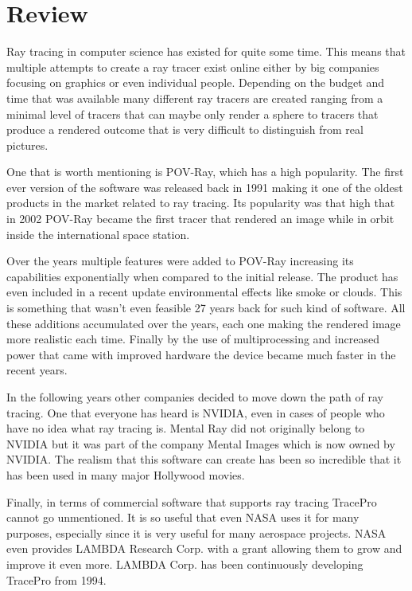 \documentclass[10pt]{scrartcl}
\begin{document}
\section{Review}
Ray tracing in computer science has existed for quite some time. This means that multiple attempts to create a ray tracer exist online either by big companies focusing on graphics or even individual people. Depending on the budget and time that was available many different ray tracers are created ranging from a minimal level of tracers that can maybe only render a sphere to tracers that produce a rendered outcome that is very difficult to distinguish from real pictures. \par
One that is worth mentioning is POV-Ray, which has a high popularity.  The first ever version of the software was released back in 1991 making it one of the oldest products in the market related to ray tracing. Its popularity was that high that in 2002 POV-Ray became the first tracer that rendered an image while in orbit inside the international space station. \par
Over the years multiple features were added to POV-Ray increasing its capabilities exponentially when compared to the initial release.  The product has even included in a recent update environmental effects like smoke or clouds. This is something that wasn’t even feasible 27 years back for such kind of software. All these additions accumulated over the years, each one making the rendered image more realistic each time. Finally by the use of multiprocessing and increased power that came with improved hardware the device became much faster in the recent years.\par
In the following years other companies decided to move down the path of ray tracing. One that everyone has heard is NVIDIA, even in cases of people who have no idea what ray tracing is. Mental Ray did not originally belong to NVIDIA but it was part of the company Mental Images which is now owned by NVIDIA. The realism that this software can create has been so incredible that it has been used in many major Hollywood movies.\par
Finally, in terms of commercial software that supports ray tracing TracePro cannot go unmentioned. It is so useful that even NASA uses it for many purposes, especially since it is very useful for many aerospace projects. NASA even provides LAMBDA Research Corp. with a grant allowing them to grow and improve it even more. LAMBDA Corp. has been continuously developing TracePro from 1994.\par
\end{document}
